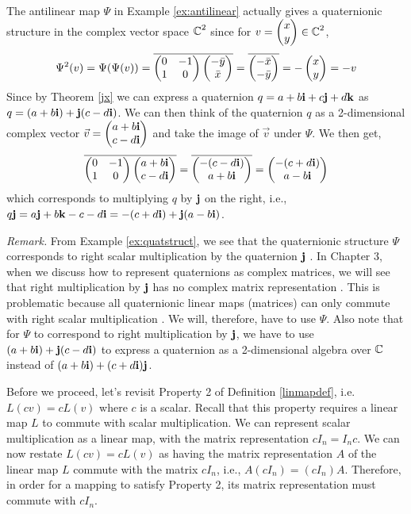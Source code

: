 \begin{ex} \label{ex:quatstruct}
	The antilinear map $\Psi$ in Example \ref{ex:antilinear} actually gives a quaternionic structure in the complex vector space $\operatorname{\mathbb{C}}^2$ since for $v = \begin{pmatrix} x \\ y \end{pmatrix} \in \operatorname{\mathbb{C}}^2$, 
	\begin{align*}
		\Psi^2(v) = \Psi(\Psi(v)) = 
		\overline{
		\begin{pmatrix}
			0 & -1 \\
			1 & 0
		\end{pmatrix}
		\begin{pmatrix} -\bar{y} \\ \bar{x} \end{pmatrix}}
		= \overline{\begin{pmatrix} -\bar{x} \\ -\bar{y} \end{pmatrix}}
		= -\begin{pmatrix} x \\ y \end{pmatrix} = -v
	\end{align*} 
	Since by Theorem \ref{jx} we can express a quaternion $q = a+b\textbf{i}+c\textbf{j}+d\textbf{k}$ as $q = (a+b\textbf{i})+\textbf{j}(c-d\textbf{i})$. We can then think of the quaternion $q$ as a 2-dimensional complex vector $\vec{v} = \begin{pmatrix} a+b\textbf{i} \\ c-d\textbf{i} \end{pmatrix}$ and take the image of $\vec{v}$ under $\Psi$. We then get,
	\begin{align*}
		\overline{
		\begin{pmatrix}
			0 & -1 \\
			1 & 0
		\end{pmatrix}
		\begin{pmatrix} a+b\textbf{i} \\ c-d\textbf{i} \end{pmatrix}
		} =
		\overline{
		\begin{pmatrix} -(c-d\textbf{i}) \\ a+b\textbf{i} \end{pmatrix}
		} =
		\begin{pmatrix} -(c+d\textbf{i}) \\ a-b\textbf{i} \end{pmatrix}
	\end{align*}
	which corresponds to multiplying $q$ by $\textbf{j}$ on the right, i.e., $q\textbf{j} = a\textbf{j} + b\textbf{k} - c - d\textbf{i} = -(c+d\textbf{i})+\textbf{j}(a-b\textbf{i})$.
\end{ex}

\textit{Remark.} From Example \ref{ex:quatstruct}, we see that the quaternionic structure $\Psi$ corresponds to right scalar multiplication by the quaternion $\textbf{j}$ \cite{aslaksen}. In Chapter 3, when we discuss how to represent quaternions as complex matrices, we will see that right multiplication by $\textbf{j}$ has no complex matrix representation \cite{aslaksen}. This is problematic because all quaternionic linear maps (matrices) can only commute with right scalar multiplication \cite{stack} \cite{aslaksen}. We will, therefore, have to use $\Psi$. Also note that for $\Psi$ to correspond to right multiplication by $\textbf{j}$, we have to use $(a+b\textbf{i})+\textbf{j}(c-d\textbf{i})$ to express a quaternion as a 2-dimensional algebra over $\operatorname{\mathbb{C}}$ instead of $(a+b\textbf{i})+(c+d\textbf{i})\textbf{j}$.

Before we proceed, let's revisit Property 2 of Definition \ref{linmapdef}, i.e. $L(cv) = cL(v)$ where $c$ is a scalar. Recall that this property requires a linear map $L$ to commute with scalar multiplication. We can represent scalar multiplication as a linear map, with the matrix representation $cI_n = I_n c$. We can now restate $L(cv) = cL(v)$ as having the matrix representation $A$ of the linear map $L$ commute with the matrix $cI_n$, i.e., $A(cI_n) = (cI_n)A$. Therefore, in order for a mapping to satisfy Property 2, its matrix representation must commute with $cI_n$.

